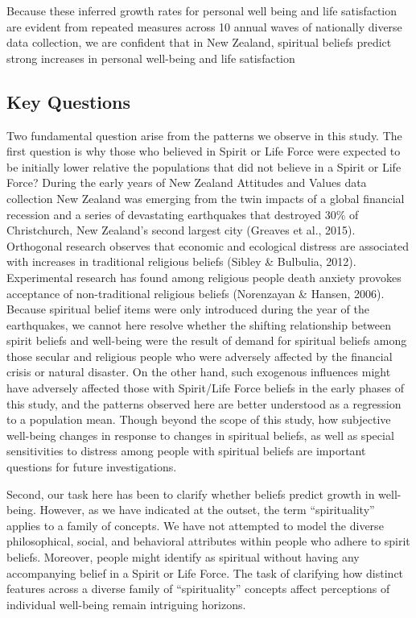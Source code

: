 \documentclass[
  english,
  man,floatsintext]{apa6}
\begin{document}
Because these inferred growth rates for personal well being and life satisfaction are evident from repeated measures across 10 annual waves of nationally diverse data collection, we are confident that in New Zealand, spiritual beliefs predict strong increases in personal well-being and life satisfaction

\hypertarget{key-questions}{%
\subsection{Key Questions}\label{key-questions}}

Two fundamental question arise from the patterns we observe in this study. The first question is why those who believed in Spirit or Life Force were expected to be initially lower relative the populations that did not believe in a Spirit or Life Force? During the early years of New Zealand Attitudes and Values data collection New Zealand was emerging from the twin impacts of a global financial recession and a series of devastating earthquakes that destroyed 30\% of Christchurch, New Zealand's second largest city (Greaves et al., 2015). Orthogonal research observes that economic and ecological distress are associated with increases in traditional religious beliefs (Sibley \& Bulbulia, 2012). Experimental research has found among religious people death anxiety provokes acceptance of non-traditional religious beliefs (Norenzayan \& Hansen, 2006). Because spiritual belief items were only introduced during the year of the earthquakes, we cannot here resolve whether the shifting relationship between spirit beliefs and well-being were the result of demand for spiritual beliefs among those secular and religious people who were adversely affected by the financial crisis or natural disaster. On the other hand, such exogenous influences might have adversely affected those with Spirit/Life Force beliefs in the early phases of this study, and the patterns observed here are better understood as a regression to a population mean. Though beyond the scope of this study, how subjective well-being changes in response to changes in spiritual beliefs, as well as special sensitivities to distress among people with spiritual beliefs are important questions for future investigations.

Second, our task here has been to clarify whether beliefs predict growth in well-being. However, as we have indicated at the outset, the term ``spirituality'' applies to a family of concepts. We have not attempted to model the diverse philosophical, social, and behavioral attributes within people who adhere to spirit beliefs. Moreover, people might identify as spiritual without having any accompanying belief in a Spirit or Life Force. The task of clarifying how distinct features across a diverse family of ``spirituality'' concepts affect perceptions of individual well-being remain intriguing horizons.
\end{document}
